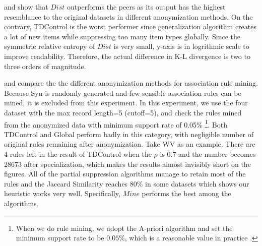  and  show that $Dist$ 
outperforms the peers as its output has the highest 
resemblance to the original datasets in different anonymization methods. 
On the contrary, TDControl is the worst performer
since generalization algorithm creates a lot of new items while
suppressing too many item types globally. 
Since the symmetric relative entropy of $Dist$ is very small, 
y-axis is in logrithmic scale to improve readability. 
Therefore, the actual difference in K-L divergence is two 
to three orders of magnitude.

 and  compare the 
the different anonymization methods for association rule mining. 
Because Syn is randomly generated and few sensible 
association rules can be mined, 
it is excluded from this experiment.
In this experiment, we use the four dataset with the 
max record length=5 (cutoff=5), and check the rules mined from 
the anonymized data with minimum support rate of 0.05\% 
\footnote{When we do rule mining, we adopt the A-priori algorithm and 
set the minimum support rate to be $0.05\%$, which is a reasonable value 
in practice \cite{Zheng:2001:RWP:502512.502572}.}.
Both TDControl and Global perform badly in this category, 
with negligible number of original rules remaining after anonymization. 
Take WV as an example. There are 4 rules left in the result of TDControl 
when the $\rho$ is 0.7 and the number becomes 28673 after specialization, 
which makes the results almost invisibly short on the figures. 
All of the partial suppression algorithms manage to retain most of 
the rules and the Jaccard Similarity reaches 80\% in some datasets 
which shows our heuristic works very well. 
Specifically, $Mine$ performs the best among the algorithms.


